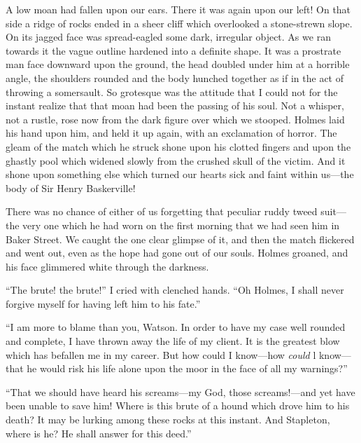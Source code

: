 \documentclass[paper=a5,BCOR=7mm,twoside,DIV=calc,12pt,usegeometry,openany,chapterprefix,endperiod,headings=big]{scrbook} %
\begin{document}
A low moan had fallen upon our ears. There it was again upon our left! On that side a ridge of rocks ended in a sheer cliff which overlooked a stone-strewn slope. On its jagged face was spread-eagled some dark, irregular object. As we ran towards it the vague outline hardened into a definite shape. It was a prostrate man face downward upon the ground, the head doubled under him at a horrible angle, the shoulders rounded and the body hunched together as if in the act of throwing a somersault. So grotesque was the attitude that I could not for the instant realize that that moan had been the passing of his soul. Not a whisper, not a rustle, rose now from the dark figure over which we stooped. Holmes laid his hand upon him, and held it up again, with an exclamation of horror. The gleam of the match which he struck shone upon his clotted fingers and upon the ghastly pool which widened slowly from the crushed skull of the victim. And it shone upon something else which turned our hearts sick and faint within us---the body of Sir Henry Baskerville!



There was no chance of either of us forgetting that peculiar ruddy tweed suit---the very one which he had worn on the first morning that we had seen him in Baker Street. We caught the one clear glimpse of it, and then the match flickered and went out, even as the hope had gone out of our souls. Holmes groaned, and his face glimmered white through the darkness.

\enquote{The brute! the brute!} I cried with clenched hands. \enquote{Oh Holmes, I shall never forgive myself for having left him to his fate.}

\enquote{I am more to blame than you, Watson. In order to have my case well rounded and complete, I have thrown away the life of my client. It is the greatest blow which has befallen me in my career. But how could I know---how \emph{could} l know---that he would risk his life alone upon the moor in the face of all my warnings?}

\enquote{That we should have heard his screams---my God, those \newline screams!---and yet have been unable to save him! Where is this brute of a hound which drove him to his death? It may be lurking among these rocks at this instant. And Stapleton, where is he? He shall answer for this deed.}
\end{document}
